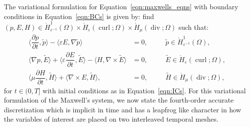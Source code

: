 \documentclass{amsart}
\theoremstyle{thmstyleone}%
\theoremstyle{thmstyletwo}%
\theoremstyle{thmstylethree}%
\DeclareMathOperator{\curl}{curl}
\def\divgn{\operatorname{div}}
\newcommand{\aInnerproduct}[2]{\bigl\langle #1, #2 \bigr\rangle}
\begin{document}
The variational formulation for Equation~\eqref{eqn:maxwells_eqns} with boundary conditions in Equation~\eqref{eqn:BCs} is given by: find $(p, E, H) \in \mathring{H}^1_{\varepsilon^{-1}}(\Omega) \times \mathring{H}_{\varepsilon}(\curl; \Omega) \times \mathring{H}_{\mu}(\divgn; \Omega)$ such that:
\begin{subequations}
  \begin{alignat}{2}
    \aInnerproduct{\dfrac{\partial p}{\partial t}}{\widetilde{p}} - \aInnerproduct{ \varepsilon E}{\nabla \widetilde{p}} &=0, &&\quad \widetilde{p} \in \mathring{H}^1_{\varepsilon^{-1}}(\Omega), \label{eqn:maxwell_p_wf} \\
    \aInnerproduct{\nabla p}{\widetilde{E}} + \aInnerproduct{\varepsilon \dfrac{\partial E}{\partial t}}{\widetilde{E}} - \aInnerproduct{H}{\nabla \times \widetilde{E}} &= 0, &&\quad \widetilde{E} \in \mathring{H}_{\varepsilon}(\curl; \Omega), \label{eqn:maxwell_E_wf} \\
    \aInnerproduct{\mu \dfrac{\partial H}{\partial t}}{\widetilde{H}} + \aInnerproduct{\nabla \times E}{\widetilde{H}}, &= 0, &&\quad \widetilde{H} \in \mathring{H}_{\mu}(\divgn; \Omega), \label{eqn:maxwell_H_wf}
  \end{alignat}
\end{subequations}
for $t \in (0, T]$ with initial conditions as in Equation~\eqref{eqn:ICs}. For this variational formulation of the Maxwell's system, we now state the fourth-order accurate discretization which is implicit in time and has a leapfrog like character in how the variables of interest are placed on two interleaved temporal meshes.
\end{document}
